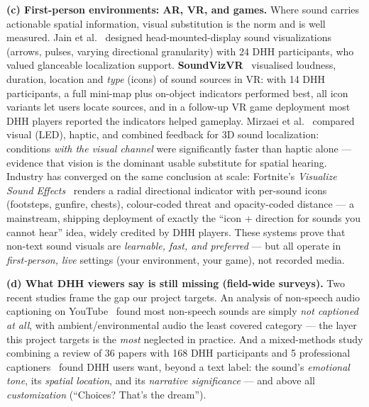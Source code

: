 \documentclass[11pt,a4paper]{article}
\begin{document}
\medskip\noindent\textbf{(c) First-person environments: AR, VR, and games.} Where sound carries
actionable spatial information, visual substitution is the norm and is well measured.
Jain et al.~\cite{hmdsound} designed head-mounted-display sound visualizations (arrows, pulses,
varying directional granularity) with 24 DHH participants, who valued glanceable localization support.
\textbf{SoundVizVR}~\cite{soundvizvr} visualised loudness, duration, location and \emph{type} (icons)
of sound sources in VR: with 14 DHH participants, a full mini-map plus on-object indicators performed
best, all icon variants let users locate sources, and in a follow-up VR game deployment most DHH
players reported the indicators helped gameplay. Mirzaei et al.~\cite{mirzaeivr} compared visual
(LED), haptic, and combined feedback for 3D sound localization: conditions \emph{with the visual
channel} were significantly faster than haptic alone --- evidence that vision is the dominant usable
substitute for spatial hearing. Industry has converged on the same conclusion at scale:
Fortnite's \emph{Visualize Sound Effects}~\cite{fortniteviz} renders a radial directional indicator
with per-sound icons (footsteps, gunfire, chests), colour-coded threat and opacity-coded distance ---
a mainstream, shipping deployment of exactly the ``icon + direction for sounds you cannot hear''
idea, widely credited by DHH players. These systems prove that non-text sound visuals are
\emph{learnable, fast, and preferred} --- but all operate in \emph{first-person, live} settings
(your environment, your game), not recorded media.

\medskip\noindent\textbf{(d) What DHH viewers say is still missing (field-wide surveys).} Two recent
studies frame the gap our project targets. An analysis of non-speech audio captioning on
YouTube~\cite{unspoken} found most non-speech sounds are simply \emph{not captioned at all}, with
ambient/environmental audio the least covered category --- the layer this project targets is the
\emph{most} neglected in practice. And a mixed-methods study combining a review of 36 papers with 168
DHH participants and 5 professional captioners~\cite{choices} found DHH users want, beyond a text
label: the sound's \emph{emotional tone}, its \emph{spatial location}, and its \emph{narrative
significance} --- and above all \emph{customization} (``Choices? That's the dream'').
\end{document}

